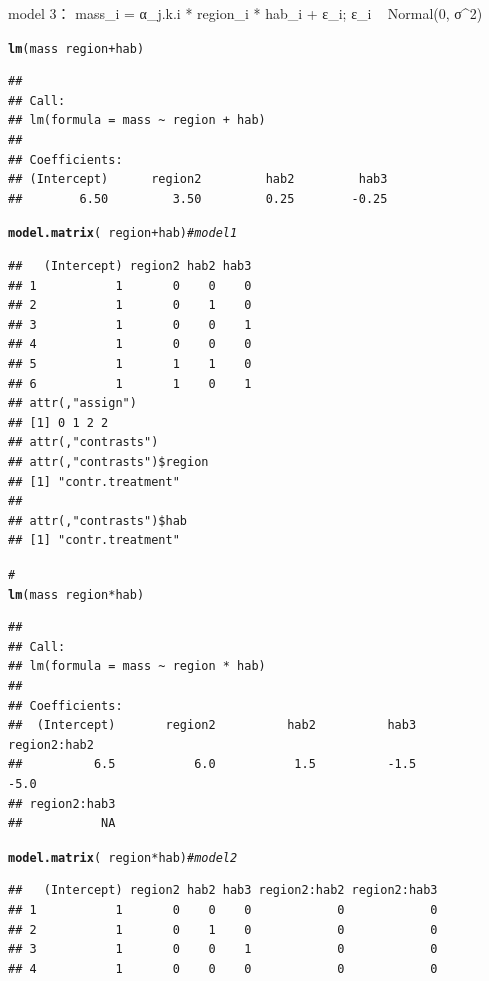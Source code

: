 \documentclass{article}\usepackage[]{graphicx}\usepackage[]{color}
\makeatletter
\newcommand{\hlcom}[1]{\textcolor[rgb]{0.678,0.584,0.686}{\textit{#1}}}%
\newcommand{\hlopt}[1]{\textcolor[rgb]{0,0,0}{#1}}%
\newcommand{\hlstd}[1]{\textcolor[rgb]{0.345,0.345,0.345}{#1}}%
\newcommand{\hlkwd}[1]{\textcolor[rgb]{0.737,0.353,0.396}{\textbf{#1}}}%
\newenvironment{kframe}{%
 \def\at@end@of@kframe{}%
 \ifinner\ifhmode%
  \def\at@end@of@kframe{\end{minipage}}%
  \begin{minipage}{\columnwidth}%
 \fi\fi%
 \def\FrameCommand##1{\hskip\@totalleftmargin \hskip-\fboxsep
 \colorbox{shadecolor}{##1}\hskip-\fboxsep
     \hskip-\linewidth \hskip-\@totalleftmargin \hskip\columnwidth}%
 \MakeFramed {\advance\hsize-\width
   \@totalleftmargin\z@ \linewidth\hsize
   \@setminipage}}%
 {\par\unskip\endMakeFramed%
 \at@end@of@kframe}
\newenvironment{knitrout}{}{} %
\makeatother
\begin{document}
model 3：
mass_i = α_j.k.i * region_i * hab_i + ε_i;
      ε_i ~ Normal(0, σ^2)
      
\begin{knitrout}
\color{fgcolor}\begin{kframe}
\begin{alltt}
\hlkwd{lm}\hlstd{(mass} \hlopt{~} \hlstd{region} \hlopt{+} \hlstd{hab)}
\end{alltt}
\begin{verbatim}
## 
## Call:
## lm(formula = mass ~ region + hab)
## 
## Coefficients:
## (Intercept)      region2         hab2         hab3  
##        6.50         3.50         0.25        -0.25
\end{verbatim}
\begin{alltt}
\hlkwd{model.matrix}\hlstd{(}\hlopt{~}\hlstd{region} \hlopt{+} \hlstd{hab)}  \hlcom{# model 1}
\end{alltt}
\begin{verbatim}
##   (Intercept) region2 hab2 hab3
## 1           1       0    0    0
## 2           1       0    1    0
## 3           1       0    0    1
## 4           1       0    0    0
## 5           1       1    1    0
## 6           1       1    0    1
## attr(,"assign")
## [1] 0 1 2 2
## attr(,"contrasts")
## attr(,"contrasts")$region
## [1] "contr.treatment"
## 
## attr(,"contrasts")$hab
## [1] "contr.treatment"
\end{verbatim}
\begin{alltt}
\hlcom{# }
\hlkwd{lm}\hlstd{(mass} \hlopt{~} \hlstd{region} \hlopt{*} \hlstd{hab)}
\end{alltt}
\begin{verbatim}
## 
## Call:
## lm(formula = mass ~ region * hab)
## 
## Coefficients:
##  (Intercept)       region2          hab2          hab3  region2:hab2  
##          6.5           6.0           1.5          -1.5          -5.0  
## region2:hab3  
##           NA
\end{verbatim}
\begin{alltt}
\hlkwd{model.matrix}\hlstd{(}\hlopt{~}\hlstd{region} \hlopt{*} \hlstd{hab)}  \hlcom{# model 2}
\end{alltt}
\begin{verbatim}
##   (Intercept) region2 hab2 hab3 region2:hab2 region2:hab3
## 1           1       0    0    0            0            0
## 2           1       0    1    0            0            0
## 3           1       0    0    1            0            0
## 4           1       0    0    0            0            0

\end{verbatim}
\end{kframe}
\end{knitrout}
\end{document}
